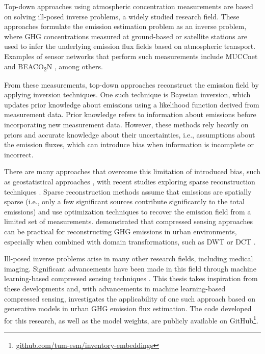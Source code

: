Top-down approaches using atmospheric concentration measurements are based on solving ill-posed inverse problems, a widely studied research field.
These approaches formulate the emission estimation problem as an inverse problem, where \gls{GHG} concentrations measured at ground-based or satellite stations are used to infer the underlying emission flux fields based on atmospheric transport.
Examples of sensor networks that perform such measurements include MUCCnet \parencite{MUCCnet} and BEACO\textsubscript{2}N \parencite{BEACON2N}, among others.

From these measurements, top-down approaches reconstruct the emission field by applying inversion techniques.
One such technique is Bayesian inversion, which updates prior knowledge about emissions using a likelihood function derived from measurement data.
Prior knowledge refers to information about emissions before incorporating new measurement data.
However, these methods rely heavily on priors and accurate knowledge about their uncertainties, i.e., assumptions about the emission fluxes, which can introduce bias when information is incomplete or incorrect.

There are many approaches that overcome this limitation of introduced bias, such as geostatistical approaches \parencite{Geostatical}, with recent studies exploring sparse reconstruction techniques \parencite{UrbanSparseReconstruction}. %
Sparse reconstruction methods assume that emissions are spatially sparse (i.e., only a few significant sources contribute significantly to the total emissions) and use optimization techniques to recover the emission field from a limited set of measurements.
\textcite{UrbanSparseReconstruction} demonstrated that compressed sensing approaches can be practical for reconstructing \gls{GHG} emissions in urban environments, especially when combined with domain transformations, such as \gls{DWT} \parencite{Wavelets} or \gls{DCT} \parencite{DCT}.

Ill-posed inverse problems arise in many other research fields, including medical imaging.
Significant advancements have been made in this field through machine learning-based compressed sensing techniques \parencite{ReviewCSUsingAI}.
This thesis takes inspiration from these developments and, with advancements in machine learning-based compressed sensing, investigates the applicability of one such approach based on generative models in urban \gls{GHG} emission flux estimation.
The code developed for this research, as well as the model weights, are publicly available on GitHub\footnote{\href{https://github.com/tum-esm/inventory-embeddings}{github.com/tum-esm/inventory-embeddings}}.

